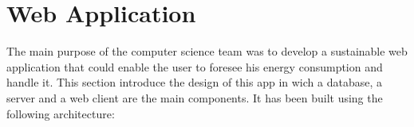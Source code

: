 %
%
\section{Web Application}

The main purpose of the computer science team was to develop a sustainable web application that could enable the user to foresee his energy consumption and handle it.  This section introduce the design of this app in wich a database, a server and a web client are the main components. It has been built using the following architecture:

    \begin{figure}[!h] %
        \centering
    \end{figure}
% 





